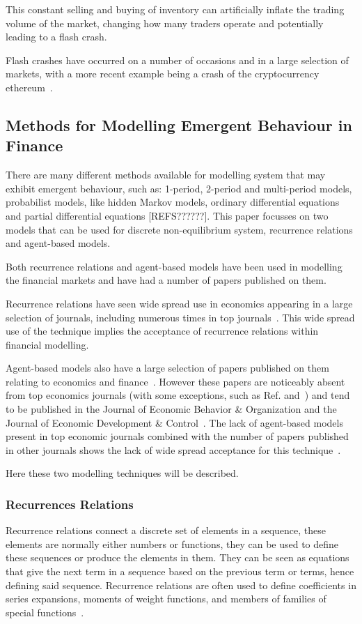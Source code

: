 \documentclass{article}
\begin{document}
This constant selling and buying of inventory can artificially inflate the trading volume of the market, changing how many traders operate and potentially leading to a flash crash.

Flash crashes have occurred on a number of occasions and in a large selection of markets, with a more recent example being a crash of the cryptocurrency ethereum~\cite{cryptocrash}.


\subsection{Methods for Modelling Emergent Behaviour in Finance}  \label{litreviewofabmrr} 
There are many different methods available for modelling system that may exhibit emergent behaviour, such as: 1-period, 2-period and multi-period models, probabilist models, like hidden Markov models, ordinary differential equations and partial differential equations [REFS??????]. This paper focusses on two models that can be used for discrete non-equilibrium system, recurrence relations and agent-based models. 

Both recurrence relations and agent-based models have been used in modelling the financial markets and have had a number of papers published on them.

Recurrence relations have seen wide spread use in economics appearing in a large selection of journals, including numerous times in top journals~\cite{rra10, rra1, rra2, rra3, rra4, rra5, rra6, rra7, rra8, rra9}. This wide spread use of the technique implies the acceptance of recurrence relations within financial modelling.      

Agent-based models also have a large selection of papers published on them relating to economics and finance~\cite{ abma2, abma3, abma4}. However these papers are noticeably absent from top economics journals (with some exceptions, such as Ref.\cite{abmexp1} and~\cite{abmexp2}) and tend to be published in the Journal of Economic Behavior \& Organization and the Journal of Economic Development \& Control~\cite{whereabmp, farmerfoleynature}. The lack of agent-based models present in top economic journals combined with the number of papers published in other journals shows the lack of wide spread acceptance for this technique~\cite{agbntj, econmistsnoabm, lob_noecomimists}.

Here these two modelling techniques will be described.  


\subsubsection{Recurrences Relations} 
Recurrence relations connect a discrete set of elements in a sequence, these elements are normally either numbers or functions, they can be used to define these sequences or produce the elements in them. They can be seen as equations that give the next term in a sequence based on the previous term or terms, hence defining said sequence. Recurrence relations are often used to define coefficients in series expansions, moments of weight functions, and members of families of special functions~\cite{recurrelationbook}.
\end{document}
